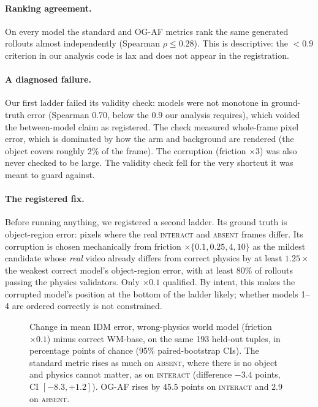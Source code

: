 \documentclass[10pt]{article}
\newcommand{\cond}[1]{\textsc{#1}}
\begin{document}
\paragraph{Ranking agreement.} On every model the standard and OG-AF metrics rank the
same generated rollouts almost independently (Spearman $\rho\leq0.28$). This is
descriptive: the $<0.9$ criterion in our analysis code is lax and does not appear in the
registration.

\paragraph{A diagnosed failure.} Our first ladder failed its validity check: models were
not monotone in ground-truth error (Spearman 0.70, below the 0.9 our analysis requires),
which voided the between-model claim as registered. The check measured whole-frame pixel
error, which is dominated by how the arm and background are rendered (the object covers
roughly 2\% of the frame). The corruption (friction $\times3$) was also never checked to
be large. The validity check fell for the very shortcut it was meant to guard against.

\paragraph{The registered fix.} Before running anything, we registered a second ladder.
Its ground truth is object-region error: pixels where the real \cond{interact} and
\cond{absent} frames differ. Its corruption is chosen mechanically from friction
$\times\{0.1,0.25,4,10\}$ as the mildest candidate whose \emph{real} video already
differs from correct physics by at least $1.25\times$ the weakest correct model's
object-region error, with at least 80\% of rollouts passing the physics validators.
Only $\times0.1$ qualified. By intent, this makes the corrupted model's position at the
bottom of the ladder likely; whether models 1--4 are ordered correctly is not
constrained.

\begin{figure}[t]
\centering
\begin{minipage}{0.5\linewidth}\end{minipage}\hfill
\begin{minipage}{0.47\linewidth}\small
\caption{Change in mean IDM error, wrong-physics world model (friction $\times0.1$)
minus correct WM-base, on the same 193 held-out tuples, in percentage points of chance
(95\% paired-bootstrap CIs). The standard metric rises as much on \cond{absent}, where
there is no object and physics cannot matter, as on \cond{interact} (difference
$-3.4$ points, CI $[-8.3,+1.2]$). OG-AF rises by 45.5 points on \cond{interact} and
2.9 on \cond{absent}.}
\label{fig:h2}
\end{minipage}
\end{figure}
\end{document}
